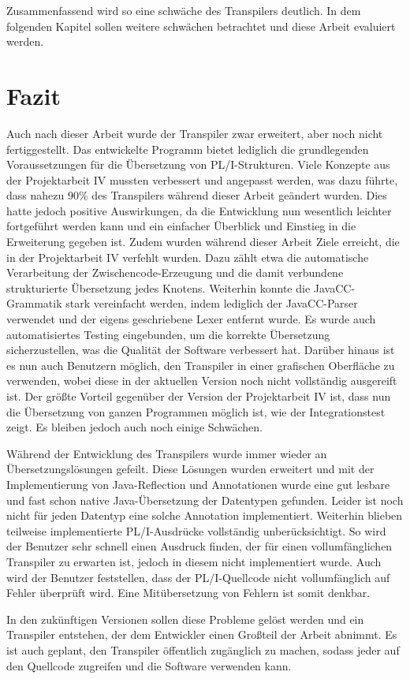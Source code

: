 Zusammenfassend wird so eine schwäche des Transpilers deutlich. In dem folgenden Kapitel sollen weitere schwächen betrachtet und diese Arbeit evaluiert werden.

\section{Fazit}
Auch nach dieser Arbeit wurde der Transpiler zwar erweitert, aber noch nicht fertiggestellt.
Das entwickelte Programm bietet lediglich die grundlegenden Voraussetzungen für die Übersetzung von PL/I-Strukturen.
Viele Konzepte aus der Projektarbeit IV mussten verbessert und angepasst werden, was dazu führte, dass nahezu 90\% des Transpilers
während dieser Arbeit geändert wurden. Dies hatte jedoch positive Auswirkungen, da die Entwicklung nun wesentlich leichter fortgeführt werden kann
und ein einfacher Überblick und Einstieg in die Erweiterung gegeben ist.
Zudem wurden während dieser Arbeit Ziele erreicht, die in der Projektarbeit IV verfehlt wurden. Dazu zählt etwa
die automatische Verarbeitung der Zwischencode-Erzeugung und die damit verbundene strukturierte Übersetzung jedes Knotens.
Weiterhin konnte die JavaCC-Grammatik stark vereinfacht werden, indem lediglich der JavaCC-Parser verwendet und der eigens geschriebene
Lexer entfernt wurde.
Es wurde auch automatisiertes Testing eingebunden, um die korrekte Übersetzung sicherzustellen, was die Qualität der Software verbessert hat.
Darüber hinaus ist es nun auch Benutzern möglich, den Transpiler in einer grafischen Oberfläche zu verwenden,
wobei diese in der aktuellen Version noch nicht vollständig ausgereift ist.
Der größte Vorteil gegenüber der Version der Projektarbeit IV ist, dass nun die Übersetzung von ganzen Programmen möglich ist, wie der Integrationstest zeigt.
Es bleiben jedoch auch noch einige Schwächen.

Während der Entwicklung des Transpilers wurde immer wieder an Übersetzungslösungen gefeilt. Diese Lösungen wurden erweitert und mit der Implementierung von Java-Reflection und Annotationen wurde eine gut lesbare und fast schon native Java-Übersetzung der Datentypen gefunden. Leider ist noch nicht für jeden Datentyp eine solche Annotation implementiert.
Weiterhin blieben teilweise implementierte PL/I-Ausdrücke vollständig unberücksichtigt. So wird der Benutzer sehr schnell einen Ausdruck finden, der für einen vollumfänglichen Transpiler zu erwarten ist, jedoch in diesem nicht implementiert wurde.
Auch wird der Benutzer feststellen, dass der PL/I-Quellcode nicht vollumfänglich auf Fehler überprüft wird. Eine Mitübersetzung von Fehlern ist somit denkbar.

In den zukünftigen Versionen sollen diese Probleme gelöst werden und ein Transpiler entstehen, der dem Entwickler einen Großteil der Arbeit abnimmt.
Es ist auch geplant, den Transpiler öffentlich zugänglich zu machen, sodass jeder auf den Quellcode zugreifen und die Software verwenden kann.


